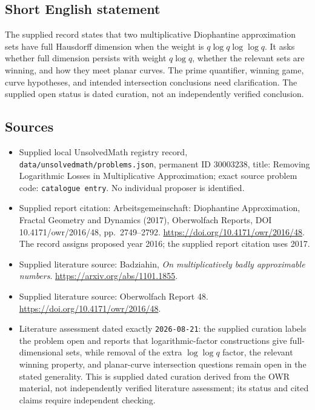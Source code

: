 \documentclass[11pt]{article}
\begin{document}
\subsection{Short English statement}
The supplied record states that two multiplicative Diophantine approximation sets have full Hausdorff dimension when the weight is \(q\log q\log\log q\). It asks whether full dimension persists with weight \(q\log q\), whether the relevant sets are winning, and how they meet planar curves. The prime quantifier, winning game, curve hypotheses, and intended intersection conclusions need clarification. The supplied open status is dated curation, not an independently verified conclusion.
\subsection{Sources}
\begin{itemize}
\item Supplied local UnsolvedMath registry record, \texttt{data/unsolvedmath/problems.json}, permanent ID \(30003238\), title: Removing Logarithmic Losses in Multiplicative Approximation; exact source problem code: \texttt{catalogue entry}. No individual proposer is identified.
\item Supplied report citation: Arbeitsgemeinschaft: Diophantine Approximation, Fractal Geometry and Dynamics (2017), Oberwolfach Reports, DOI 10.4171/owr/2016/48, pp.\ 2749--2792. \url{https://doi.org/10.4171/owr/2016/48}. The record assigns proposed year 2016; the supplied report citation uses 2017.
\item Supplied literature source: Badziahin, \emph{On multiplicatively badly approximable numbers}. \url{https://arxiv.org/abs/1101.1855}.
\item Supplied literature source: Oberwolfach Report 48. \url{https://doi.org/10.4171/owr/2016/48}.
\item Literature assessment dated exactly \texttt{2026-08-21}: the supplied curation labels the problem open and reports that logarithmic-factor constructions give full-dimensional sets, while removal of the extra \(\log\log q\) factor, the relevant winning property, and planar-curve intersection questions remain open in the stated generality. This is supplied dated curation derived from the OWR material, not independently verified literature assessment; its status and cited claims require independent checking.
\end{itemize}
\end{document}
